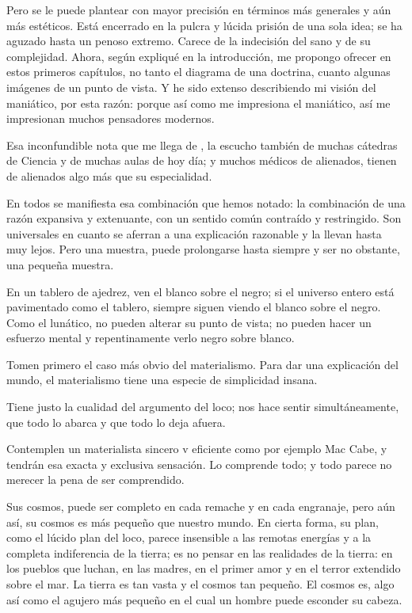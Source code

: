 Pero se le puede plantear con mayor precisión en términos más generales y aún más estéticos. Está
encerrado en la pulcra y lúcida prisión de una sola idea; se ha aguzado hasta un penoso extremo. Carece
de la indecisión del sano y de su complejidad. Ahora, según expliqué en la introducción, me propongo
ofrecer en estos primeros capítulos, no tanto el diagrama de una doctrina, cuanto algunas imágenes de un
punto de vista. Y he sido extenso describiendo mi visión del maniático, por esta razón: porque así como
me impresiona el maniático, así me impresionan muchos pensadores modernos.

Esa inconfundible nota que me llega de , la escucho también de muchas cátedras de
Ciencia y de muchas aulas de hoy día; y muchos médicos de alienados, tienen de alienados algo más que
su especialidad.

En todos se manifiesta esa combinación que hemos notado: la combinación de una razón expansiva
y extenuante, con un sentido común contraído y restringido. Son universales en cuanto se aferran a una
explicación razonable y la llevan hasta muy lejos. Pero una muestra, puede prolongarse hasta siempre y
ser no obstante, una pequeña muestra.

En un tablero de ajedrez, ven el blanco sobre el negro; si el universo entero está pavimentado como
el tablero, siempre siguen viendo el blanco sobre el negro. Como el lunático, no pueden alterar su punto
de vista; no pueden hacer un esfuerzo mental y repentinamente verlo negro sobre blanco.

Tomen primero el caso más obvio del materialismo. Para dar una explicación del mundo, el
materialismo tiene una especie de simplicidad insana.

Tiene justo la cualidad del argumento del loco; nos hace sentir simultáneamente, que todo lo abarca
y que todo lo deja afuera.

Contemplen un materialista sincero v eficiente como por ejemplo Mac Cabe, y tendrán esa exacta y
exclusiva sensación. Lo comprende todo; y todo parece no merecer la pena de ser comprendido.

Sus cosmos, puede ser completo en cada remache y en cada engranaje, pero aún así, su cosmos es
más pequeño que nuestro mundo. En cierta forma, su plan, como el lúcido plan del loco, parece insensible
a las remotas energías y a la completa indiferencia de la tierra; es no pensar en las realidades de la tierra:
en los pueblos que luchan, en las madres, en el primer amor y en el terror extendido sobre el mar. La
tierra es tan vasta y el cosmos tan pequeño. El cosmos es, algo así como el agujero más pequeño en el
cual un hombre puede esconder su cabeza.


